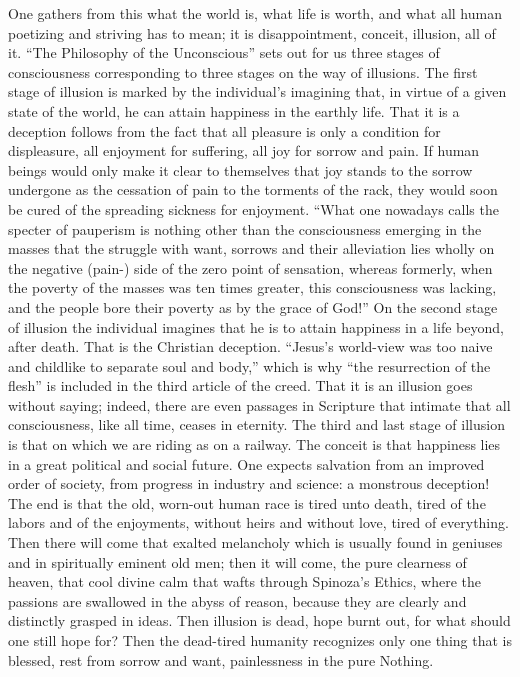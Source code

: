 \documentclass[12pt,a4paper,openany]{book}
\newcommand{\opage}[1]{\marginnote{\footnotesize\textit{[#1]}}}
\begin{document}
One gathers from this what the world is, what life is
worth, and what all human poetizing and striving has to
mean; it is disappointment, conceit, illusion, all of it.
``The Philosophy of the Unconscious'' sets out for us three stages of consciousness
corresponding to three stages on the way of illusions. The first
stage of illusion is marked by the individual's imagining
that, in virtue of a given state of the world, he can attain happiness
in the earthly life. That it is a deception follows from the fact
that all pleasure is only a condition for displeasure, all enjoyment for
suffering, all joy for sorrow and pain. If human beings
would only make it clear to themselves that joy stands to
the sorrow undergone as the cessation of pain to the torments
of the rack, they would soon be cured of the
spreading sickness for enjoyment. ``What one nowadays calls
the specter of pauperism is nothing other than the consciousness
emerging in the masses that the struggle with want,
sorrows and their alleviation lies wholly on the negative
(pain-) side of the zero point of sensation, whereas
formerly, when the poverty of the masses was ten times greater, this
consciousness was lacking, and the people bore their poverty as
by the grace of God!'' On the second stage of illusion the individual
imagines that he is to attain happiness in a life beyond,
after death. That is the Christian deception. ``Jesus's world-view
was too naive and childlike to separate soul
\setcounter{footnote}{0}%
\opage{15}and body,'' which is why ``the resurrection of the flesh'' is
included in the third article of the creed. That it is an illusion goes
without saying; indeed, there are even passages in Scripture that
intimate that all consciousness, like all time, ceases in eternity.
The third and last stage of illusion is that on which
we are riding as on a railway. The conceit is that
happiness lies in a great political and social future. One
expects salvation from an improved order of society, from
progress in industry and science: a monstrous deception!
The end is that the old, worn-out human race is
tired unto death, tired of the labors and of the enjoyments,
without heirs and without love, tired of everything. Then
there will come that exalted melancholy which is usually
found in geniuses and in spiritually eminent old men; then
it will come, the pure clearness of heaven, that cool divine
calm that wafts through Spinoza's Ethics, where the passions
are swallowed in the abyss of reason, because they are clearly and
distinctly grasped in ideas. Then illusion is dead, hope
burnt out, for what should one still hope for? Then
the dead-tired humanity recognizes only one thing that is
blessed, rest from sorrow and want, painlessness in the pure
Nothing.
\end{document}
